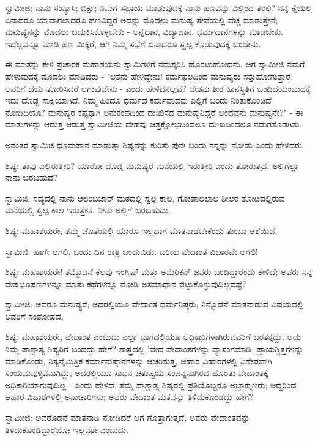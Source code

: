 ಸ್ವಾಮೀಜಿ: ನಾನು ಸಂನ್ಯಾಸಿ; ಭಿಕ್ಷು; ನಿಮಗೆ ಸಹಾಯ ಮಾಡುವುದಕ್ಕೆ ನಾನು ಹಣವನ್ನು ಎಲ್ಲಿಂದ ತರಲಿ? ನನ್ನ ಕೈಯಲ್ಲಿ ಏನಾದರೂ ಯಾವಾಗಲಾದರೂ ಹಣವಿದ್ದರೆ ಅದನ್ನು ಮೊದಲು ಮನುಷ್ಯ ಸೇವೆಯಲ್ಲಿ ವೆಚ್ಚ ಮಾಡುತ್ತೇನೆ; ಮನುಷ್ಯನನ್ನು ಮೊದಲು ಬದುಕಿಸಿಕೊಳ್ಳಬೇಕು - ಅನ್ನದಾನ, ವಿದ್ಯಾದಾನ, ಧರ್ಮದಾನಗಳನ್ನು ಮಾಡಬೇಕು. ಇದೆಲ್ಲವನ್ನೂ ಮಾಡಿ ಹಣ ಮಿಕ್ಕರೆ, ಆಗ ನಿಮ್ಮ ಸಭೆಗೆ ಏನಾದರೂ ಸ್ವಲ್ಪ ಕೊಡುವುದಕ್ಕೆ ಬಂದೇನು.

ಈ ಮಾತನ್ನು ಕೇಳಿ ಪ್ರಚಾರಕ ಮಹಾಶಯನು ಸ್ವಾಮಿಗಳಿಗೆ ನಮಸ್ಕರಿಸಿ ಹೊರಟುಹೋದನು. ಆಗ ಸ್ವಾಮೀಜಿ ನಮಗೆ ಹೇಳುವುದಕ್ಕೆ ಮೊದಲು ಮಾಡಿದರು - "ಆತನು ಹೇಳಿದ್ದೇನು! ಕರ್ಮಫಲದಿಂದ ಮನುಷ್ಯರು ಸತ್ತುಹೋಗುತ್ತಾರೆ, ಅವರಿಗೆ ದಯೆ ತೋರಿಸಿದರೆ ಆಗುವುದೇನು - ಎಂದು ಹೇಳಿದನಲ್ಲವೆ? ದೇಶವು ತೀರ ಹೀನಸ್ಥಿತಿಗೆ ಬಂದಿದೆಯೆಂಬುದಕ್ಕೆ ಇದು ದೊಡ್ಡ ಸಾಕ್ಷಿಯಾಗಿದೆ. ನಿಮ್ಮ ಹಿಂದೂ ಧರ್ಮದ ಕರ್ಮವಾದವು ಎಲ್ಲಿಗೆ ಬಂದು ನಿಂತುಕೊಂಡಿದೆ ನೋಡಿದಿಯೊ? ಮನುಷ್ಯರ ಕಷ್ಟಕ್ಕಾಗಿ ಅನುಕಂಪದಿಂದ ದುಃಖಿಸದ ಮನುಷ್ಯನಿದ್ದರೆ ಅಂಥವನು ಮನುಷ್ಯನೇ?" - ಈ ಮಾತುಗಳನ್ನು ಆಡುತ್ತ ಆಡುತ್ತ ಸ್ವಾಮೀಜಿಯ ದೇಹವು ಚಿತ್ತಕ್ಷೋಭದಿಂದಲೂ ದುಃಖದಿಂದಲೂ ನಡುಗತೊಡಗಿತು.

ಅನಂತರ ಸ್ವಾಮಿಜಿ ಧೂಮಪಾನ ಮಾಡುತ್ತಾ ಶಿಷ್ಯನನ್ನು ಕುರಿತು ಪುನಃ ಬಂದು ನನ್ನನ್ನು ನೋಡು ಎಂದು ಹೇಳಿದರು.

ಶಿಷ್ಯ: ತಾವು ಎಲ್ಲಿರುತ್ತೀರಿ? ಯಾರೋ ದೊಡ್ಡ ಮನುಷ್ಯರ ಮನೆಯಲ್ಲಿ ಇರುತ್ತೀರಿ ಎಂದು ತೋರುತ್ತದೆ. ಅಲ್ಲಿಗೆಲ್ಲಾ ನಾನು ಬರಬಹುದೆ?

ಸ್ವಾಮಿಜಿ: ಸದ್ಯದಲ್ಲಿ ನಾನು ಆಲಂಬಜಾರ್‌ ಮಠದಲ್ಲಿ ಸ್ವಲ್ಪ ಕಾಲ, ಗೋಪಾಲಲಾಲ ಶೀಲರ ತೋಟದಲ್ಲಿರುವ ಮನೆಯಲ್ಲಿ ಸ್ವಲ್ಪ ಕಾಲ ಇರುತ್ತೇನೆ. ನೀನು ಅಲ್ಲಿಗೆ ಬರಬಹುದು.

ಶಿಷ್ಯ: ಮಹಾಶಯರೇ, ತಮ್ಮ ಜೊತೆಯಲ್ಲಿ ಯಾರೂ ಇಲ್ಲದಾಗ ಮಾತನಾಡಬೇಕೆಂದು ತುಂಬಾ ಆಶೆಯಿದೆ.

ಸ್ವಾಮಿಜಿ: ಹಾಗೇ ಆಗಲಿ, ಒಂದು ದಿನ ರಾತ್ರಿ ಬಂದುಬಿಡು. ಬರಿಯ ವೇದಾಂತ ವಿಚಾರವೇ ಆಗಲಿ!

ಶಿಷ್ಯ: ಮಹಾಶಯರೇ! ತಮ್ಮೊಡನೆ ಕೆಲವು ಇಂಗ್ಲಿಷ್ ಮತ್ತು ಅಮೆರಿಕನ್ ಜನರು ಬಂದಿದ್ದಾರೆಂದು ಕೇಳಿದೆ; ಅವರು ನನ್ನ ವೇಷಭೂಷಣಗಳನ್ನೂ ಮಾತು ಕಥೆಗಳನ್ನೂ ನೋಡಿ ಅಸಮಾಧಾನ ಪಟ್ಟುಕೊಳ್ಳುವುದಿಲ್ಲವಷ್ಟೆ?

ಸ್ವಾಮೀಜಿ: ಅವರೂ ಮನುಷ್ಯರೆ; ಅದರಲ್ಲಿಯೂ ವೇದಾಂತ ಧರ್ಮನಿಷ್ಠರು; ನಿನ್ನೊಡನೆ ಮಾತನಾಡುವ ವಿಷಯದಲ್ಲಿ ಅವರಿಗೆ ಸಂತೋಷವೆ.

ಶಿಷ್ಯ: ಮಹಾಶಯರೇ, ವೇದಾಂತ ಎಂಬುದು ಎಲ್ಲಾ ಭಾಗದಲ್ಲಿಯೂ ಅಧಿಕಾರಿಗಳಾಗಿರುವವರಿಗೆ ಬರತಕ್ಕದ್ದು. ಅದು ನಿಮ್ಮ ಪಾಶ್ಚಾತ್ಯ ಶಿಷ್ಯರಿಗೆ ಬಂದದ್ದು ಹೇಗೆ? ಶಾಸ್ತ್ರದಲ್ಲಿ 'ವೇದ ವೇದಾಂತಗಳನ್ನು ವ್ಯಾಸಂಗಮಾಡಿ, ಪ್ರಾಯಶ್ಚಿತ್ತಗಳನ್ನು ಮಾಡಿಕೊಂಡು, ನಿತ್ಯನೈಮಿತ್ತಿಕ ಕರ್ಮಾನುಷ್ಠಾನಗಳನ್ನು ಆಚರಿಸುತ್ತ, ಆಹಾರ ವಿಹಾರಗಳಲ್ಲಿ ವಿಶೇಷವಾಗಿ ಸಂಯಮವುಳ್ಳವನಾಗಿದ್ದು, ಅದರಲ್ಲಿಯೂ ಸಾಧನ ಚತುಷ್ಟಯ ಸಂಪನ್ನನಾಗಿರದ ಹೊರತು ವೇದಾಂತಕ್ಕೆ ಅಧಿಕಾರಿಯಾಗುವುದಿಲ್ಲ - ಎಂದು ಹೇಳಿದೆ. ತಮ್ಮ ಪಾಶ್ಚಾತ್ಯ ಶಿಷ್ಯರಲ್ಲಿ ಪ್ರತಿಯೊಬ್ಬರೂ ಅಬ್ರಾಹ್ಮಣರು; ಆದ್ದರಿಂದ ಆಹಾರ ವಿಹಾರಗಳಲ್ಲಿ ಅನಾಚಾರಿಗಳು; ಅವರು ವೇದಾಂತ ಮತವನ್ನು ತಿಳಿದುಕೊಂಡದ್ದು ಹೇಗೆ?

ಸ್ವಾಮೀಜಿ: ಅವರೊಡನೆ ಮಾತನಾಡಿ ನೋಡಿದರೆ ಆಗ ಗೊತ್ತಾಗುತ್ತದೆ, ಅವರು ವೇದಾಂತವನ್ನು ತಿಳಿದುಕೊಂಡಿದ್ದಾರೆಯೋ ಇಲ್ಲವೋ ಎಂಬುದು.

